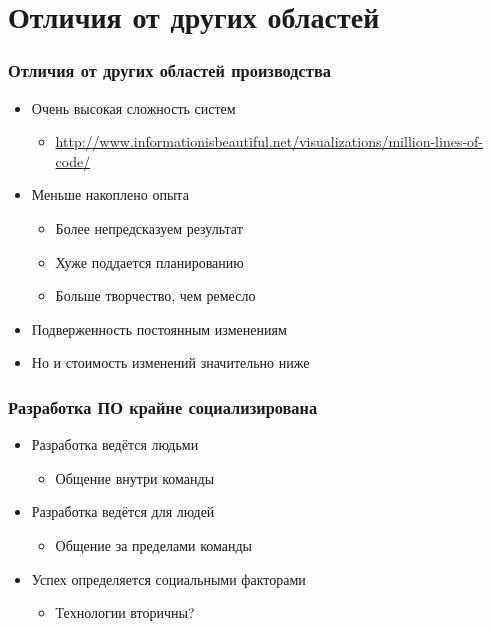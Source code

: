 \documentclass{../../slides-style}
\begin{document}
    \section{Отличия от других областей}

    \begin{frame}
        \frametitle{Отличия от других областей производства}
        \begin{itemize}
            \item Очень высокая сложность систем
            \begin{itemize}
                \item \url{http://www.informationisbeautiful.net/visualizations/million-lines-of-code/}
            \end{itemize}
            \item Меньше накоплено опыта
            \begin{itemize}
                \item Более непредсказуем результат
                \item Хуже поддается планированию
                \item Больше творчество, чем ремесло
            \end{itemize}
            \item Подверженность постоянным изменениям
            \item Но и стоимость изменений значительно ниже
        \end{itemize}
    \end{frame}

    \begin{frame}
        \frametitle{Разработка ПО крайне социализирована}
        \begin{itemize}
            \item Разработка ведётся людьми
            \begin{itemize}
                \item Общение внутри команды
            \end{itemize}
            \item Разработка ведётся для людей
            \begin{itemize}
                \item Общение за пределами команды
            \end{itemize}
            \item Успех определяется социальными факторами
            \begin{itemize}
                \item Технологии вторичны?
            \end{itemize}
        \end{itemize}
    \end{frame}
\end{document}
